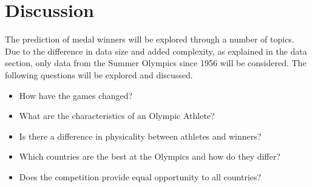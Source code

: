 \documentclass[a4 paper, 12pt]{article}
\begin{document}
\section{Discussion}
The prediction of medal winners will be explored through a number of topics. Due to the difference in data size and added complexity, as explained in the data section, only data from the Summer Olympics since 1956 will be considered. The following questions will be explored and discussed.
            \begin{itemize}
                \item How have the games changed?
                \item What are the characteristics of an Olympic Athlete?
                \item Is there a difference in physicality between athletes and winners?
                \item Which countries are the best at the Olympics and how do they differ?
                \item Does the competition provide equal opportunity to all countries?
            \end{itemize}
\end{document}
